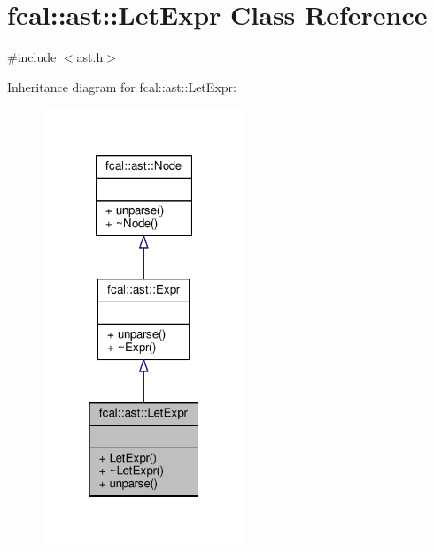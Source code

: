 \hypertarget{classfcal_1_1ast_1_1LetExpr}{}\section{fcal\+:\+:ast\+:\+:Let\+Expr Class Reference}
\label{classfcal_1_1ast_1_1LetExpr}


{\ttfamily \#include $<$ast.\+h$>$}



Inheritance diagram for fcal\+:\+:ast\+:\+:Let\+Expr\+:
\nopagebreak
\begin{figure}[H]
\begin{center}
\leavevmode
\includegraphics[width=172pt]{classfcal_1_1ast_1_1LetExpr__inherit__graph}
\end{center}
\end{figure}


